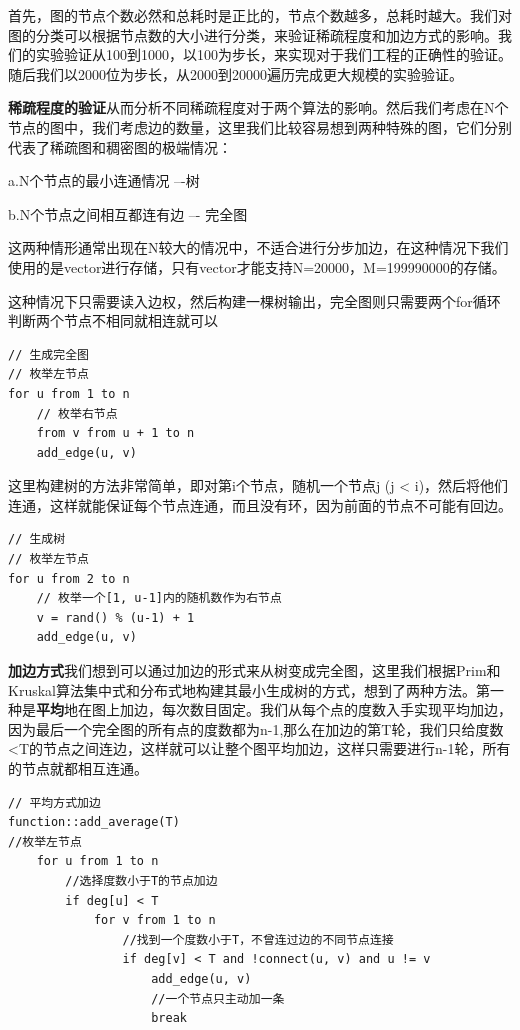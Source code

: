\documentclass[UTF8]{ctexart}
\begin{document}
首先，图的节点个数必然和总耗时是正比的，节点个数越多，总耗时越大。我们对图的分类可以根据节点数的大小进行分类，来验证稀疏程度和加边方式的影响。我们的实验验证从100到1000，以100为步长，来实现对于我们工程的正确性的验证。
随后我们以2000位为步长，从2000到20000遍历完成更大规模的实验验证。\newline

\noindent\textbf{稀疏程度的验证}\quad 从而分析不同稀疏程度对于两个算法的影响。然后我们考虑在N个节点的图中，我们考虑边的数量，这里我们比较容易想到两种特殊的图，它们分别代表了稀疏图和稠密图的极端情况：

a.N个节点的最小连通情况 –-树

b.N个节点之间相互都连有边 –- 完全图

这两种情形通常出现在N较大的情况中，不适合进行分步加边，在这种情况下我们使用的是vector进行存储，只有vector才能支持N=20000，M=199990000的存储。

这种情况下只需要读入边权，然后构建一棵树输出，完全图则只需要两个for循环判断两个节点不相同就相连就可以

\begin{lstlisting}
// 生成完全图
// 枚举左节点
for u from 1 to n
    // 枚举右节点
    from v from u + 1 to n
    add_edge(u, v)
\end{lstlisting}

这里构建树的方法非常简单，即对第i个节点，随机一个节点j (j < i)，然后将他们连通，这样就能保证每个节点连通，而且没有环，因为前面的节点不可能有回边。
\begin{lstlisting}
// 生成树
// 枚举左节点
for u from 2 to n
    // 枚举一个[1, u-1]内的随机数作为右节点
    v = rand() % (u-1) + 1
    add_edge(u, v)
\end{lstlisting}


\noindent\textbf{加边方式}\quad 我们想到可以通过加边的形式来从树变成完全图，这里我们根据Prim和Kruskal算法集中式和分布式地构建其最小生成树的方式，想到了两种方法。第一种是\textbf{平均}地在图上加边，每次数目固定。我们从每个点的度数入手实现平均加边，因为最后一个完全图的所有点的度数都为n-1,那么在加边的第T轮，我们只给度数<T的节点之间连边，这样就可以让整个图平均加边，这样只需要进行n-1轮，所有的节点就都相互连通。

\begin{lstlisting}
// 平均方式加边
function::add_average(T)
//枚举左节点
    for u from 1 to n
        //选择度数小于T的节点加边
        if deg[u] < T
            for v from 1 to n
                //找到一个度数小于T，不曾连过边的不同节点连接
                if deg[v] < T and !connect(u, v) and u != v
                    add_edge(u, v)
                    //一个节点只主动加一条
                    break
\end{lstlisting}
\end{document}
